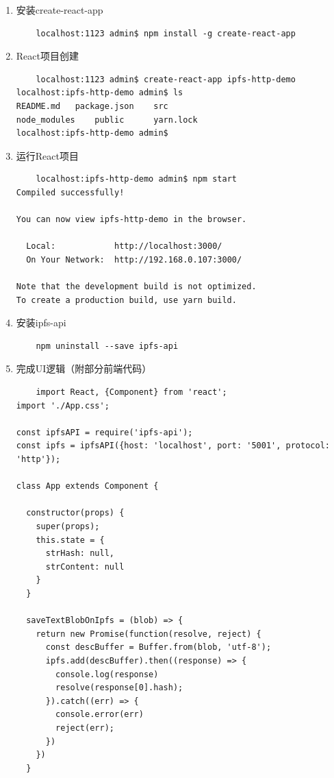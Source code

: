 \documentclass[a4paper,12pt,titlepage]{ctexart}
\begin{document}
\begin{enumerate}
\item 安装create-react-app
	\begin{verbatim}
	localhost:1123 admin$ npm install -g create-react-app
	\end{verbatim}

\item React项目创建
	\begin{verbatim}
	localhost:1123 admin$ create-react-app ipfs-http-demo
localhost:ipfs-http-demo admin$ ls
README.md	package.json	src
node_modules	public		yarn.lock
localhost:ipfs-http-demo admin$
	\end{verbatim}

\item 运行React项目
	\begin{verbatim}
	localhost:ipfs-http-demo admin$ npm start
Compiled successfully!

You can now view ipfs-http-demo in the browser.

  Local:            http://localhost:3000/
  On Your Network:  http://192.168.0.107:3000/

Note that the development build is not optimized.
To create a production build, use yarn build.

	\end{verbatim}
	
\item 安装ipfs-api
	\begin{verbatim}
	npm uninstall --save ipfs-api
	\end{verbatim}
	
\item 完成UI逻辑（附部分前端代码）
\begin{footnotesize}


	\begin{verbatim}
	import React, {Component} from 'react';
import './App.css';

const ipfsAPI = require('ipfs-api');
const ipfs = ipfsAPI({host: 'localhost', port: '5001', protocol: 'http'});

class App extends Component {

  constructor(props) {
    super(props);
    this.state = {
      strHash: null,
      strContent: null
    }
  }

  saveTextBlobOnIpfs = (blob) => {
    return new Promise(function(resolve, reject) {
      const descBuffer = Buffer.from(blob, 'utf-8');
      ipfs.add(descBuffer).then((response) => {
        console.log(response)
        resolve(response[0].hash);
      }).catch((err) => {
        console.error(err)
        reject(err);
      })
    })
  }


\end{verbatim}
\end{footnotesize}
\end{enumerate}
\end{document}
